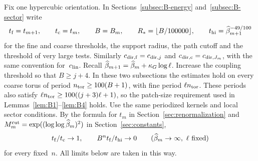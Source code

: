 Fix one hypercubic orientation. In Sections~\ref{subsec:B-energy} and~\ref{subsec:B-sector} write
\begin{equation*}
t_{\rm f}=t_{m+1},\qquad t_{\rm c}=t_m,\qquad B=B_m,\qquad R_*=\lfloor B/100000\rfloor,\qquad t_{\rm hi}=\widehat{\beta}_{m+1}^{-49/100}
\end{equation*}
for the fine and coarse thresholds, the support radius, the path cutoff and the threshold of very large tests. Similarly $c_{{\rm dir},{\rm f}}=c_{{\rm dir},j}$ and $c_{{\rm dir},{\rm c}}=c_{{\rm dir},J_m}$, with the same convention for~$c_{\rm lin}$. Recall $\widehat{\beta}_{m+1}=\widehat{\beta}_m+\kappa_G\log\ell$. Increase the coupling threshold so that $B\ge j+4$. In these two subsections the estimates hold on every coarse torus of period $n_{\rm tor}\ge100(B+1)$, with fine period $\ell n_{\rm tor}$. These periods also satisfy $\ell n_{\rm tor}\ge100((j+3)\ell+1)$, so the patch-size requirement used in Lemmas~\ref{lem:B1}--\ref{lem:B4} holds. Use the same periodized kernels and local sector conditions. By the formula for $t_m$ in Section~\ref{sec:renormalization} and $M^{\mathrm{cut}}_m=\exp((\log\log\widehat{\beta}_m)^2)$ in Section~\ref{sec:constants},
\begin{equation*}
t_{\rm f}/t_{\rm c}\to1,\qquad B^nt_{\rm f}/t_{\rm hi}\to0\qquad(\widehat{\beta}_m\to\infty,\ \ell\text{ fixed})
\end{equation*}
for every fixed~$n$. All limits below are taken in this way.

